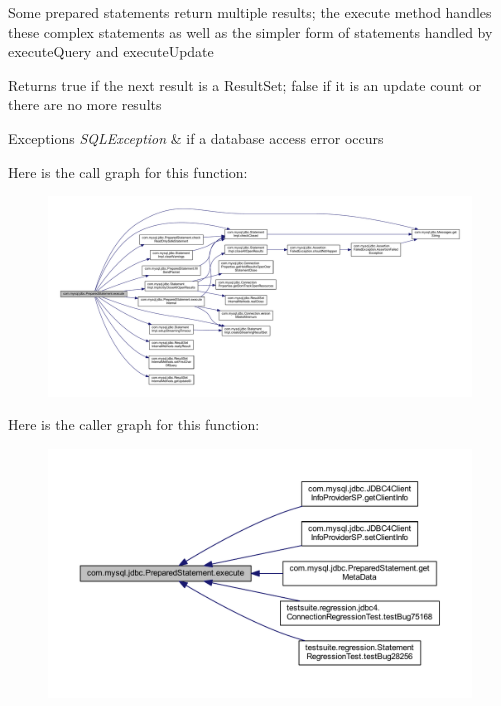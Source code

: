 Some prepared statements return multiple results; the execute method handles these complex statements as well as the simpler form of statements handled by execute\+Query and execute\+Update

\begin{DoxyReturn}{Returns}
true if the next result is a Result\+Set; false if it is an update count or there are no more results
\end{DoxyReturn}

\begin{DoxyExceptions}{Exceptions}
{\em S\+Q\+L\+Exception} & if a database access error occurs \\
\hline
\end{DoxyExceptions}
Here is the call graph for this function\+:
\nopagebreak
\begin{figure}[H]
\begin{center}
\leavevmode
\includegraphics[width=350pt]{classcom_1_1mysql_1_1jdbc_1_1_prepared_statement_a4c83f4279e13f60aa65dd4de3d2117e1_cgraph}
\end{center}
\end{figure}
Here is the caller graph for this function\+:
\nopagebreak
\begin{figure}[H]
\begin{center}
\leavevmode
\includegraphics[width=350pt]{classcom_1_1mysql_1_1jdbc_1_1_prepared_statement_a4c83f4279e13f60aa65dd4de3d2117e1_icgraph}
\end{center}
\end{figure}
\mbox{\label{classcom_1_1mysql_1_1jdbc_1_1_prepared_statement_a4b54450205db6b099922240e4f2e72a0}} 
